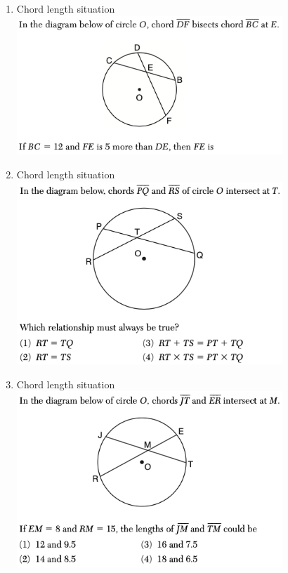 \documentclass[12pt, oneside]{article}
\begin{document}
\begin{enumerate}
\newpage
\item Chord length situation\\
\includegraphics[width=10cm]{R-2images/R-2chordsD.png}

\item Chord length situation\\
\includegraphics[width=10cm]{R-2images/R-2chordsE.png}

\item Chord length situation\\
\includegraphics[width=10cm]{R-2images/R-2chordsF.png}


\end{enumerate}
\end{document}
